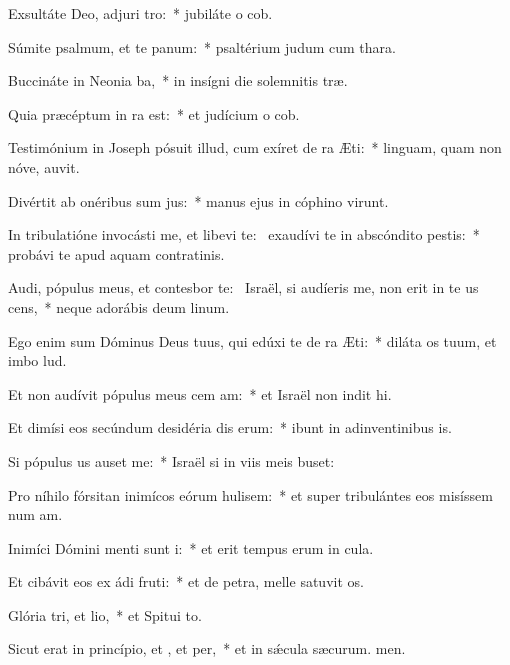 \item Exsultáte Deo, adjuri tro:~* jubiláte o cob.
\item Súmite psalmum, et te panum:~* psaltérium judum cum thara.
\item Buccináte in Neonia ba,~* in insígni die solemnitis træ.
\item Quia præcéptum in ra est:~* et judícium o cob.
\item Testimónium in Joseph pósuit illud, cum exíret de ra Æti:~* linguam, quam non nóve, auvit.
\item Divértit ab onéribus sum jus:~* manus ejus in cóphino virunt.
\item In tribulatióne invocásti me, et libevi te:~\pscross{} exaudívi te in abscóndito pestis:~* probávi te apud aquam contratinis.
\item Audi, pópulus meus, et contesbor te:~\pscross{} Israël, si audíeris me, non erit in te us cens,~* neque adorábis deum linum.
\item Ego enim sum Dóminus Deus tuus, qui edúxi te de ra Æti:~* diláta os tuum, et imbo lud.
\item Et non audívit pópulus meus cem am:~* et Israël non indit hi.
\item Et dimísi eos secúndum desidéria dis erum:~* ibunt in adinventinibus is.
\item Si pópulus us auset me:~* Israël si in viis meis buset:
\item Pro níhilo fórsitan inimícos eórum hulisem:~* et super tribulántes eos misíssem num am.
\item Inimíci Dómini menti sunt i:~* et erit tempus erum in cula.
\item Et cibávit eos ex ádi fruti:~* et de petra, melle satuvit os.
\item Glória tri, et lio,~* et Spitui to.
\item Sicut erat in princípio, et , et per,~* et in sǽcula sæcurum. men.
